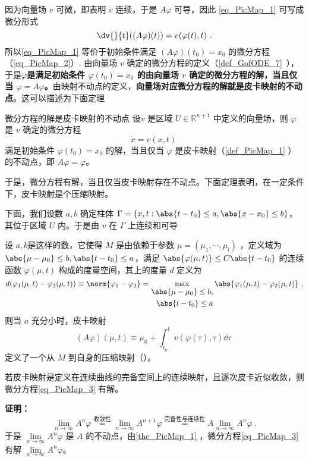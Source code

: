 因为向量场 $v$ 可微，即表明 $v$ 连续，于是 $A\varphi$ 可导，因此 \autoref{eq_PicMap_1} 可写成微分形式
\begin{equation}\label{eq_PicMap_2}
\dv{}{t}((A\varphi)(t))=v(\varphi(t),t)~.
\end{equation}
所以\autoref{eq_PicMap_1} 等价于初始条件满足 $(A\varphi)(t_0)=x_0$ 的微分方程（\autoref{eq_PicMap_2}）. 由向量场 $v$ 确定的微分方程的定义（\autoref{def_GofODE_7}~），于是\textbf{$\varphi$是满足初始条件 $\varphi(t_0)=x_0$ 的由向量场 $v$ 确定的微分方程的解，当且仅当 $\varphi=A\varphi$。}由映射不动点的定义，\textbf{向量场对应微分方程的解就是皮卡映射的不动点}。这可以描述为下面定理
\begin{theorem}{微分方程的解是皮卡映射的不动点}\label{the_PicMap_1}
设$v$ 是区域 $U\in\mathbb R^{n+1}$ 中定义的向量场，则 $\varphi$ 是 $v$ 确定的微分方程
\begin{equation}\label{eq_PicMap_3}
\dot x=v(x,t)~
\end{equation}
满足初始条件 $\varphi(t_0)=x_0$ 的解，当且仅当 $\varphi$ 是皮卡映射（\autoref{def_PicMap_1} ）的不动点，即 $A\varphi=\varphi$。
\end{theorem}
于是，微分方程有解，当且仅当皮卡映射存在不动点。下面定理表明，在一定条件下，皮卡映射是个压缩映射。

下面，我们设数 $a,b$ 确定柱体 $\Gamma=\{x,t:\abs{t-t_0}\leq a,\abs{x-x_0}\leq b\}$，其位于区域 $U$ 内。于是由 $v$ 在 $\Gamma$ 上连续和可导

\begin{theorem}{}
设 $a,b$是这样的数，它使得 $M$ 是由依赖于参数 $\mu=(\mu_1,\cdots,\mu_l)$ ，定义域为 $\abs{\mu-\mu_0}\leq b,\abs{t-t_0}\leq a$，满足 $\abs{\varphi(\mu,t)}\leq C\abs{t-t_0}$ 的连续函数 $\varphi(\mu,t)$ 构成的度量空间，其上的度量 $d$ 定义为
\begin{equation}
d(\varphi_1(\mu,t)-\varphi_2(\mu,t))\equiv\norm{\varphi_1-\varphi_2}=\max_{\begin{aligned}\abs{\mu-\mu_0}\leq b,\\\abs{t-t_0}\leq a\end{aligned}}\abs{\varphi_1(\mu,t)-\varphi_2(\mu,t)}~.
\end{equation}
则当 $a$ 充分小时，皮卡映射
\begin{equation}
(A\varphi)(\mu,t)\equiv \mu_0+\int_{t_0}^{t}v(\varphi(\tau),\tau)\dd \tau~
\end{equation}
定义了一个从 $M$ 到自身的压缩映射（）。

若皮卡映射是定义在连续曲线的完备空间上的连续映射，且逐次皮卡近似收敛，则微分方程\autoref{eq_PicMap_3} 有解。
\end{theorem}
\textbf{证明：}
\begin{equation}
\lim_{n\rightarrow\infty}A^n\varphi\overset{\text{收敛性}}{=}\lim_{n\rightarrow\infty}A^{n+1}\varphi \overset{\text{完备性与连续性}}{=}A\lim_{n\rightarrow\infty}A^n\varphi~.
\end{equation}
于是 $\lim\limits_{n\rightarrow\infty}A^n\varphi$ 是 $A$ 的不动点，由\autoref{the_PicMap_1} ，微分方程\autoref{eq_PicMap_3} 有解 $\lim\limits_{n\rightarrow\infty}A^n\varphi$。


